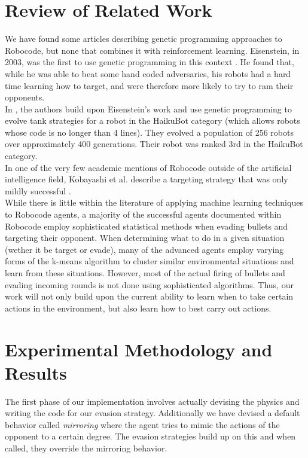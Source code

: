 \documentclass{article}
\theoremstyle{plain}
\theoremstyle{definition}
\theoremstyle{remark}
\begin{document}
\section{Review of Related Work}
We have found some articles describing genetic programming approaches to Robocode, but none that combines it with reinforcement learning. Eisenstein, in 2003, was the first to use genetic programming in this context \cite{gp2}. He found that, while he was able to beat some hand coded adversaries, his robots had a hard time learning how to target, and were therefore more likely to try to ram their opponents.\\

In \cite{gp1}, the authors build upon Eisenstein's work and use genetic programming to evolve tank strategies for a robot in the HaikuBot category (which allows robots whose code is no longer than 4 lines). They evolved a population of 256 robots over approximately 400 generations. Their robot was ranked 3rd in the HaikuBot category.\\

In one of the very few academic mentions of Robocode outside of the artificial intelligence field, Kobayashi et al. describe a targeting strategy that was only mildly successful \cite{strategies}. \\

While there is little within the literature of applying machine learning techniques to Robocode agents, a majority of the successful agents documented within Robocode employ sophisticated statistical methods when evading bullets and targeting their opponent. When determining what to do in a given situation (wether it be target or evade), many of the advanced agents employ varying forms of the k-means algorithm to cluster similar environmental situations and learn from these situations. However, most of the actual firing of bullets and evading incoming rounds is not done using sophisticated algorithms. Thus, our work will not only build upon the current ability to learn when to take certain actions in the environment, but also learn how to best carry out actions. 

\section{Experimental Methodology and Results}
The first phase of our implementation involves actually devising the physics and writing the code for our evasion strategy. Additionally we have devised a default behavior called \emph{mirroring} where the agent tries to mimic the actions of the opponent to a certain degree. The evasion strategies build up on this and when called, they override the mirroring behavior. 
\end{document}
